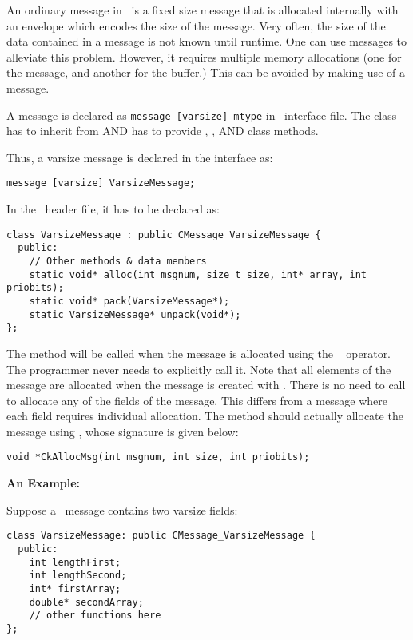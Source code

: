 An ordinary message in \charmpp\ is a fixed size message that is
allocated internally with an envelope which encodes the size of the
message. Very often, the size of the data contained in a message is
not known until runtime. One can use  messages to alleviate 
this problem. However, it requires multiple memory allocations (one
for the message, and another for the buffer.) This can be avoided by
making use of a  message.

A  message is declared as {\tt message [varsize] mtype} in
\charmpp\ interface file. The class  has to inherit from
 AND has to provide ,
, AND  class methods.

Thus, a varsize message is declared in the interface as: 

\verb+message [varsize] VarsizeMessage;+ 

In the \CC\ header file, it has to be declared as: 

\begin{verbatim}
class VarsizeMessage : public CMessage_VarsizeMessage { 
  public:
    // Other methods & data members 
    static void* alloc(int msgnum, size_t size, int* array, int priobits);
    static void* pack(VarsizeMessage*);
    static VarsizeMessage* unpack(void*);
}; 
\end{verbatim}

The  method will be called when the message is allocated using
the \CC\  operator. The programmer never needs to explicitly
call it.  Note that all elements of the message are allocated when the message is created with .  There is no need to call  to allocate any of the fields of the message.  This differs from a  message where each field requires individual allocation.     
The  method should actually allocate the message using
, whose signature is given below:

\begin{verbatim}
void *CkAllocMsg(int msgnum, int size, int priobits); 
\end{verbatim}  

{\bf An Example:}

Suppose a \charmpp\ message contains two varsize fields:

\begin{verbatim} 
class VarsizeMessage: public CMessage_VarsizeMessage {
  public:
    int lengthFirst;
    int lengthSecond;
    int* firstArray;
    double* secondArray;
    // other functions here
};
\end{verbatim}

